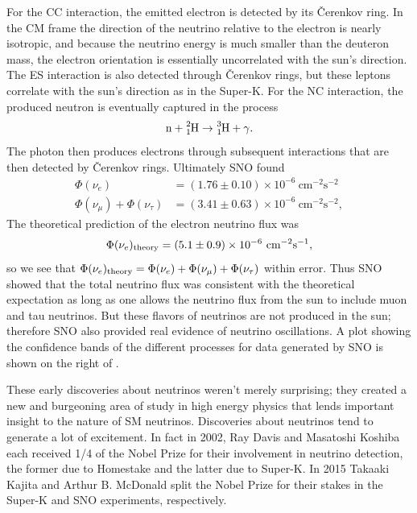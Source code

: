 For the CC interaction, the
emitted electron is detected by its \v{C}erenkov ring. In the CM frame
the direction of the neutrino relative to the electron is nearly isotropic, and
because the neutrino energy is much smaller than the deuteron mass, the
electron orientation is essentially uncorrelated with the sun's direction.
The ES interaction is also detected through \v{C}erenkov rings, but these
leptons correlate with the sun's direction as in the Super-K. For the NC
interaction, the produced neutron is eventually captured in the process
\begin{equation}
 \text{n}+\ce{^2_1H}\to\ce{^3_1H}+\gamma.
\end{equation}
The photon then produces electrons through subsequent interactions that are
then detected by \v{C}erenkov rings. Ultimately SNO found
\begin{equation}
  \begin{aligned}
    \Phi(\nu_e)&=(1.76\pm0.10)\times10^{-6}~\text{cm}^{-2}\text{s}^{-2} \\
    \Phi(\nu_\mu)+\Phi(\nu_\tau)
               &=(3.41\pm0.63)\times10^{-6}~\text{cm}^{-2}\text{s}^{-2},
  \end{aligned}
\end{equation}
The theoretical prediction of the electron neutrino flux was
\begin{equation}
  \Phi(\nu_e)_{\rm theory}
    =(5.1\pm0.9)\times10^{-6}~\text{cm}^{-2}\text{s}^{-1}, 
\end{equation}
so we see that 
$\Phi(\nu_e)_{\rm theory}=\Phi(\nu_e)+\Phi(\nu_\mu)+\Phi(\nu_\tau)$
within error. Thus SNO showed that the total
neutrino flux was consistent with the theoretical expectation as long as
one allows the neutrino flux from the sun to include muon and tau neutrinos.
But these flavors of neutrinos are not produced in the sun; therefore SNO also
provided real evidence of neutrino oscillations.
A plot showing the confidence bands of the different processes for data
generated by SNO is shown on the right of .

These early discoveries about neutrinos weren't merely surprising; they
created a new and burgeoning area of study in high energy physics
that lends important
insight to the nature of SM neutrinos. Discoveries about neutrinos tend
to generate a lot of excitement.
In fact in 2002, Ray Davis and Masatoshi Koshiba each received 1/4 of
the Nobel Prize for their involvement in neutrino detection, the former
due to Homestake and the latter due to Super-K. In 2015 
Takaaki Kajita and Arthur B. McDonald split the Nobel Prize for their
stakes in the Super-K and SNO experiments, respectively.


